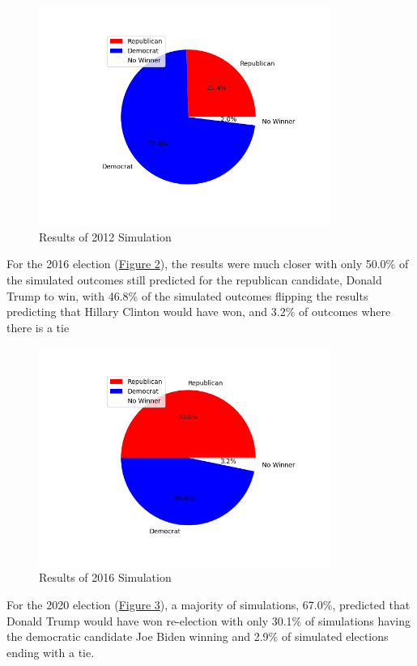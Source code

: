 \documentclass{article}
\begin{document}
\begin{figure}
\centering
\includegraphics[width=0.85\textwidth]{data-2012.png}
\caption{\label{fig:2012}Results of 2012 Simulation}
\end{figure}

For the 2016 election (\hyperref[fig:2016]{Figure 2}), the results were much closer with only 50.0\% of the simulated outcomes still predicted for the republican candidate, Donald Trump to win, with 46.8\% of the simulated outcomes flipping the results predicting that Hillary Clinton would have won, and 3.2\% of outcomes where there is a tie

\begin{figure}
\centering
\includegraphics[width=0.85\textwidth]{data-2016.png}
\caption{\label{fig:2016}Results of 2016 Simulation}
\end{figure}

For the 2020 election (\hyperref[fig:2020]{Figure 3}), a majority of simulations, 67.0\%, predicted that Donald Trump would have won re-election with only 30.1\% of simulations having the democratic candidate Joe Biden winning and 2.9\% of simulated elections ending with a tie.
\end{document}
